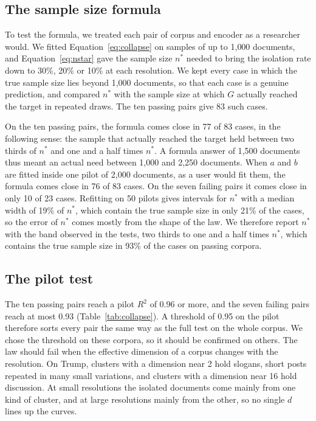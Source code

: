 \subsection{The sample size formula}
\label{sec:nstar}

To test the formula, we treated each pair of corpus and encoder as a researcher would. We fitted Equation~\ref{eq:collapse} on samples of up to 1{,}000 documents, and Equation~\ref{eq:nstar} gave the sample size $n^{*}$ needed to bring the isolation rate down to 30\%, 20\% or 10\% at each resolution. We kept every case in which the true sample size lies beyond 1{,}000 documents, so that each case is a genuine prediction, and compared $n^{*}$ with the sample size at which $G$ actually reached the target in repeated draws. The ten passing pairs give 83 such cases.

On the ten passing pairs, the formula comes close in 77 of 83 cases, in the following sense: the sample that actually reached the target held between two thirds of $n^{*}$ and one and a half times $n^{*}$. A formula answer of 1{,}500 documents thus meant an actual need between 1{,}000 and 2{,}250 documents. When $a$ and $b$ are fitted inside one pilot of 2{,}000 documents, as a user would fit them, the formula comes close in 76 of 83 cases. On the seven failing pairs it comes close in only 10 of 23 cases. Refitting on 50 pilots gives intervals for $n^{*}$ with a median width of 19\% of $n^{*}$, which contain the true sample size in only 21\% of the cases, so the error of $n^{*}$ comes mostly from the shape of the law. We therefore report $n^{*}$ with the band observed in the tests, two thirds to one and a half times $n^{*}$, which contains the true sample size in 93\% of the cases on passing corpora.

\subsection{The pilot test}
\label{sec:diag}

The ten passing pairs reach a pilot $R^2$ of 0.96 or more, and the seven failing pairs reach at most 0.93 (Table~\ref{tab:collapse}). A threshold of 0.95 on the pilot therefore sorts every pair the same way as the full test on the whole corpus. We chose the threshold on these corpora, so it should be confirmed on others. The law should fail when the effective dimension of a corpus changes with the resolution. On Trump, clusters with a dimension near 2 hold slogans, short posts repeated in many small variations, and clusters with a dimension near 16 hold discussion. At small resolutions the isolated documents come mainly from one kind of cluster, and at large resolutions mainly from the other, so no single $d$ lines up the curves.

